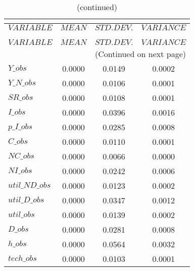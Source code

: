  
\begin{center}
\begin{longtable}{lccc} 
\caption{THEORETICAL MOMENTS}\\
 \label{Table:th_moments}\\
\toprule 
$VARIABLE       $	 & 	 $         MEAN$	 & 	 $    STD. DEV.$	 & 	 $     VARIANCE$\\
\midrule \endfirsthead 
\caption{(continued)}\\
 \toprule \\ 
$VARIABLE       $	 & 	 $         MEAN$	 & 	 $    STD. DEV.$	 & 	 $     VARIANCE$\\
\midrule \endhead 
\midrule \multicolumn{4}{r}{(Continued on next page)} \\ \bottomrule \endfoot 
\bottomrule \endlastfoot 
$Y\_obs         $	 & 	       0.0000	 & 	       0.0149	 & 	       0.0002 \\ 
$Y\_N\_obs      $	 & 	       0.0000	 & 	       0.0106	 & 	       0.0001 \\ 
$SR\_obs        $	 & 	       0.0000	 & 	       0.0108	 & 	       0.0001 \\ 
$I\_obs         $	 & 	       0.0000	 & 	       0.0396	 & 	       0.0016 \\ 
$p\_I\_obs      $	 & 	       0.0000	 & 	       0.0285	 & 	       0.0008 \\ 
$C\_obs         $	 & 	       0.0000	 & 	       0.0110	 & 	       0.0001 \\ 
$NC\_obs        $	 & 	       0.0000	 & 	       0.0066	 & 	       0.0000 \\ 
$NI\_obs        $	 & 	       0.0000	 & 	       0.0242	 & 	       0.0006 \\ 
$util\_ND\_obs  $	 & 	       0.0000	 & 	       0.0123	 & 	       0.0002 \\ 
$util\_D\_obs   $	 & 	       0.0000	 & 	       0.0347	 & 	       0.0012 \\ 
$util\_obs      $	 & 	       0.0000	 & 	       0.0139	 & 	       0.0002 \\ 
$D\_obs         $	 & 	       0.0000	 & 	       0.0281	 & 	       0.0008 \\ 
$h\_obs         $	 & 	       0.0000	 & 	       0.0564	 & 	       0.0032 \\ 
$tech\_obs      $	 & 	       0.0000	 & 	       0.0103	 & 	       0.0001 \\ 
\end{longtable}
 \end{center}
